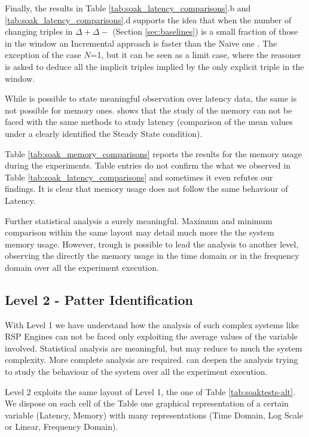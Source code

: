 Finally, the results in Table \ref{tab:soak_latency_comparisons}.b and \ref{tab:soak_latency_comparisons}.d supports the idea that when the number of changing triples in $\Delta+ \Delta-$ (Section \ref{sec:baselines}) is a small fraction of those in the window an Incremental approach is faster than the Naive one \cite{DellAglio2014,DBLP:conf/cikm/RenP11,DBLP:conf/semweb/UrbaniMJHB13}. The exception of the case $N$=1, but it can be seen as a limit case, where the reasoner is asked to deduce all the implicit triples implied by the only explicit triple in the window.  

While is possible to state meaningful observation over latency data, the same is not possible for memory ones. \name shows that the study of the memory can not be faced with the same methods to study latency (comparison of the mean values under a clearly identified the Steady State condition). 

Table \ref{tab:soak_memory_comparisons} reports the results for the memory usage during the experiments. Table entries do not confirm the what we observed in Table \ref{tab:soak_latency_comparisons} and sometimes it even refutes our findings. It is clear that memory usage does not follow the same behaviour of Latency.

Further statistical analysis a surely meaningful. Maximum and minimum comparison within the same layout may detail much more the the system memory usage. However, trough \name is possible to lead the analysis to another level, observing the directly the memory usage in the time domain or in the frequency domain over all the experiment execution. 

\subsection{Level 2 - Patter Identification}

With Level 1 we have understand how the analysis of such complex systems like RSP Engines can not be faced only exploiting the average values of the variable involved. Statistical analysis are meaningful, but may reduce to much the system complexity. More complete analysis are required. \name can deepen the analysis trying to study the behaviour of the system over all the experiment execution.

Level 2 exploits the same layout of Level 1, the one of Table \ref{tab:soaktests-alt}. We dispose on each cell of the Table  one graphical representation of a certain variable (Latency, Memory) with many representations (Time Domain, Log Scale or Linear, Frequency Domain).

